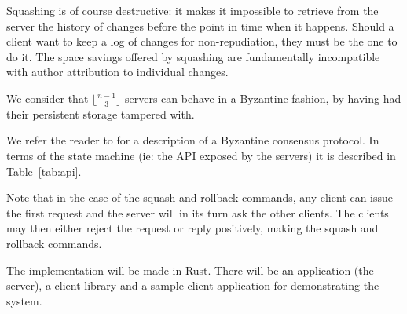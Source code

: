 Squashing is of course destructive: it makes it impossible to retrieve
from the server the history of changes before the point in time when
it happens. Should a client want to keep a log of changes for non-repudiation,
they must be the one to do it. The space savings offered by squashing are
fundamentally incompatible with author attribution to individual changes.

We consider that $\lfloor \frac{n - 1}{3} \rfloor$ servers can
behave in a Byzantine fashion, by having had their persistent
storage tampered with.

We refer the reader to \cite{pbft} for a description of a Byzantine
consensus protocol. In terms of the state machine (ie: the API
exposed by the servers) it is described in Table~\ref{tab:api}.

Note that in the case of the squash and rollback commands, any
client can issue the first request and the server will in its
turn ask the other clients. The clients may then either reject
the request or reply positively, making the squash and rollback
commands.

The implementation will be made in Rust\cite{rust}. There will be an
application (the server), a client library and a sample client
application for demonstrating the system.
